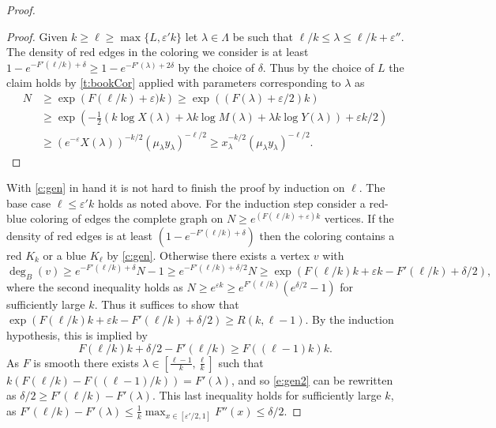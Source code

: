 \documentclass[reqno,final,12pt]{amsart}
\newcommand{\eps}{\varepsilon}
\newcommand{\s}[1]{\left(#1\right)}
\begin{document}
\begin{proof}
\begin{proof}
	Given  $k \geq \ell \geq \max\{ L, \eps' k \}$ let $\lambda \in \Lambda$ be such that $\ell/k \leq \lambda \leq \ell/k + \eps''$. The density of red edges in the coloring we consider is at least $ 1 - e^{-F'(\ell/k)+\delta} \geq 1 - e^{-F'(\lambda)+2\delta}$ by the choice of $\delta$. Thus by the choice of $L$  the claim holds by \cref{t:bookCor}  applied with parameters corresponding to $\lambda$ as \begin{align*} N &\geq \exp\s{F(\ell/k)+\eps)k} \geq \exp\s{(F(\lambda)+\eps/2)k} \\ &\geq    \exp\s{-\frac{1}{2} \s{k\log X(\lambda)+ \lambda k \log M(\lambda) + \lambda k \log Y(\lambda)}+\eps k/2} \\& \geq (e^{-\eps}X(\lambda))^{-k/2}(\mu_{\lambda} y_{\lambda})^{-\ell/2} \geq  x_{\lambda}^{-k/2}(\mu_{\lambda} y_{\lambda})^{-\ell/2}.\end{align*} 	
\end{proof}


With \cref{c:gen} in hand it is not hard to finish the proof by induction on $\ell$. The base case $\ell \leq \eps'k$ holds as noted above.
For the induction step consider a red-blue coloring of edges the complete graph on $N \geq e^{(F(\ell/k)+\eps)k}$ vertices. If the density of red edges is at least $(1 - e^{-F'(\ell/k)+\delta})$ then the coloring contains a red $K_k$ or a blue $K_{\ell}$ by \cref{c:gen}. Otherwise there exists a vertex $v$ with $$\deg_B(v) \geq e^{-F'(\ell/k)+\delta}N -1 \geq e^{-F'(\ell/k)+\delta/2}N  \geq \exp\s{F(\ell/k)k+\eps k-F'(\ell/k)+\delta/2},$$ 
where the second inequality holds  as $N \geq e^{\eps  k} \geq e^{F'(\ell/k)}(e^{\delta/2}-1)$ for sufficiently large $k$.
Thus it suffices to show that $\exp\s{F(\ell/k)k+\eps k-F'(\ell/k)+\delta/2} \geq R(k,\ell-1)$. By the induction hypothesis, this is implied by \begin{equation}\label{e:gen2}F(\ell/k)k+\delta/2-F'(\ell/k) \geq F((\ell-1)k)k.\end{equation} As $F$ is smooth there exists $\lambda \in \left[\frac{\ell-1}{k},\frac{\ell}{k}\right]$ such that
$k(F(\ell/k)-F((\ell-1)/k)) = F'(\lambda)$, and so \eqref{e:gen2} can be rewritten as $\delta/2 \geq F'(\ell/k) -F'(\lambda).$ This last inequality holds for sufficiently large $k$, as $F'(\ell/k) -F'(\lambda) \leq \frac{1}{k}\max_{x \in [\eps'/2,1]}F''(x) \leq \delta/2.$
\end{proof}
\end{document}
